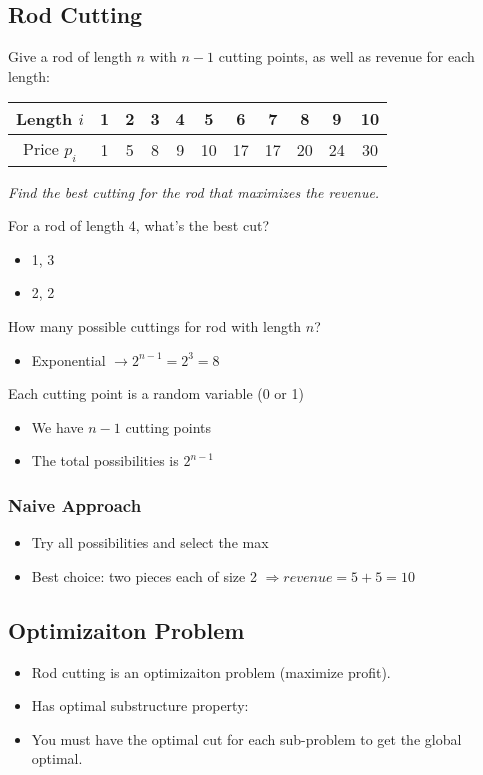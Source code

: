 \documentclass{article}
\begin{document}
\subsection*{Rod Cutting}
Give a rod of length $n$ with \(n - 1\) cutting points,
as well as revenue for each length:

\begin{tabular}{c|c|c|c|c|c|c|c|c|c|c}
    Length $i$  & 1 & 2 & 3 & 4 & 5  & 6  & 7  & 8  & 9  & 10 \\
    \hline
    Price $p_i$ & 1 & 5 & 8 & 9 & 10 & 17 & 17 & 20 & 24 & 30
\end{tabular}

\emph{Find the best cutting for the rod that maximizes the revenue.}

For a rod of length 4, what's the best cut?

\begin{itemize}
    \item 1, 3
    \item 2, 2
\end{itemize}

How many possible cuttings for rod with length $n$?

\begin{itemize}
    \item Exponential \(\rightarrow 2^{n-1} = 2^3 = 8\)
\end{itemize}

Each cutting point is a random variable (0 or 1)
\begin{itemize}
    \item We have \(n-1\) cutting points
    \item The total possibilities is \(2^{n-1}\)
\end{itemize}

\subsubsection*{Naive Approach}
\begin{itemize}
    \item Try all possibilities and select the max
    \item Best choice: two pieces each of size 2 \(\Rightarrow revenue = 5 + 5 = 10\)
\end{itemize}

\subsection*{Optimizaiton Problem}
\begin{itemize}
    \item Rod cutting is an optimizaiton problem (maximize profit).
    \item Has optimal substructure property:
    \item You must have the optimal cut for each sub-problem to get the global optimal.
\end{itemize}
\end{document}
